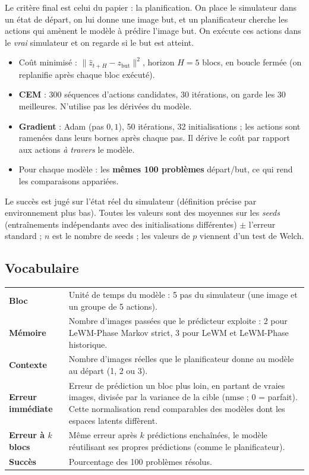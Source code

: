 \documentclass[11pt,a4paper]{article}
\newcommand{\nmse}{\mathrm{nmse}}
\begin{document}
Le critère final est celui du papier : la planification. On place le simulateur dans un
état de départ, on lui donne une image but, et un planificateur cherche les actions qui
amènent le modèle à prédire l'image but. On exécute ces actions dans le \emph{vrai}
simulateur et on regarde si le but est atteint.
\begin{itemize}
  \item Coût minimisé : $\|\hat z_{t+H} - z_{\text{but}}\|^2$, horizon $H = 5$ blocs, en
  boucle fermée (on replanifie après chaque bloc exécuté).
  \item \textbf{CEM} : 300 séquences d'actions candidates, 30 itérations, on garde les 30
  meilleures. N'utilise pas les dérivées du modèle.
  \item \textbf{Gradient} : Adam (pas $0{,}1$), 50 itérations, 32 initialisations ; les
  actions sont ramenées dans leurs bornes après chaque pas. Il dérive le coût par rapport aux
  actions \emph{à travers} le modèle.
  \item Pour chaque modèle : les \textbf{mêmes 100 problèmes} départ/but, ce qui rend les
  comparaisons appariées.
\end{itemize}
Le succès est jugé sur l'état réel du simulateur (définition précise par environnement plus
bas). Toutes les valeurs sont des moyennes sur les \emph{seeds} (entraînements indépendants
avec des initialisations différentes) $\pm$ l'erreur standard ; $n$ est le nombre de seeds ;
les valeurs de $p$ viennent d'un test de Welch.

\subsection{Vocabulaire}

\begin{center}
\begin{tabular}{@{}lp{11.5cm}@{}}
\toprule
\textbf{Bloc} & Unité de temps du modèle : 5 pas du simulateur (une image et un groupe de 5
actions). \\
\textbf{Mémoire} & Nombre d'images passées que le prédicteur exploite : 2 pour LeWM-Phase
Markov strict, 3 pour LeWM et LeWM-Phase historique. \\
\textbf{Contexte} & Nombre d'images réelles que le planificateur donne au modèle au départ
(1, 2 ou 3). \\
\textbf{Erreur immédiate} & Erreur de prédiction un bloc plus loin, en partant de vraies
images, divisée par la variance de la cible ($\nmse$ ; 0 = parfait). Cette normalisation
rend comparables des modèles dont les espaces latents diffèrent. \\
\textbf{Erreur à $k$ blocs} & Même erreur après $k$ prédictions enchaînées, le modèle
réutilisant ses propres prédictions (comme le planificateur). \\
\textbf{Succès} & Pourcentage des 100 problèmes résolus. \\
\bottomrule
\end{tabular}
\end{center}
\end{document}
